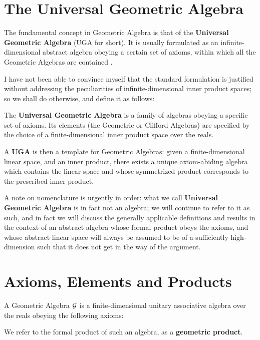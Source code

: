 \section{The Universal Geometric Algebra}

The fundamental concept in Geometric Algebra is that of the \textbf{Universal Geometric Algebra} (UGA for short). It is usually formulated as an infinite-dimensional abstract algebra obeying a certain set of axioms, within which all the Geometric Algebras are contained \cite{ga-origin}. 

I have not been able to convince myself that the standard formulation is justified without addressing the peculiarities of infinite-dimensional inner product spaces; so we shall do otherwise, and define it as follows:
\begin{definition}
	The \textbf{Universal Geometric Algebra} is a family of algebras obeying a specific set of axioms. Its elements (the Geometric or Clifford Algebras) are specified by the choice of a finite-dimensional inner product space over the reals.
\end{definition}

A \textbf{UGA} is then a template for Geometric Algebras: given a finite-dimensional linear space, and an inner product, there exists a unique axiom-abiding algebra which contains the linear space and whose symmetrized product corresponds to the prescribed inner product.

A note on nomenclature is urgently in order: what we call \textbf{Universal Geometric Algebra} is in fact not an algebra; we will continue to refer to it as such, and in fact we will discuss the generally applicable definitions and results in the context of an abstract algebra whose formal product obeys the axioms, and whose abstract linear space will always be assumed to be of a sufficiently high-dimension such that it does not get in the way of the argument.

\newpage

\section{Axioms, Elements and Products}

A Geometric Algebra $\mathcal{G}$  is a finite-dimensional unitary associative algebra over the reals obeying the following axioms:

We refer to the formal product of such an algebra, as a \textbf{geometric product}.

